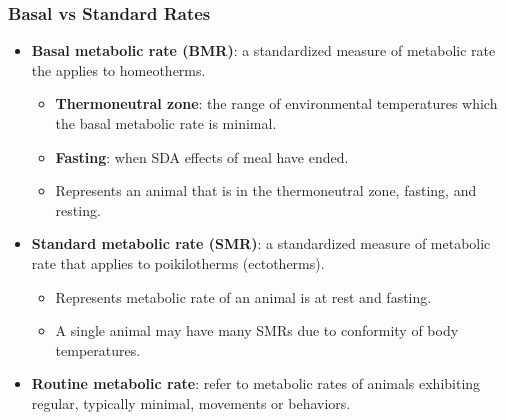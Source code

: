 \documentclass[12pt,a4paper]{article}
\begin{document}
\begin{itemize}
    \subsubsection{Basal vs Standard Rates}
    \begin{itemize}
        \item \textbf{Basal metabolic rate (BMR)}: a standardized measure of metabolic rate the applies to {\color{o-Sun}homeotherms}.
            \begin{itemize}
                \item \textbf{Thermoneutral zone}: the range of environmental temperatures which the basal metabolic rate is minimal.
                \item \textbf{Fasting}: when SDA effects of meal have ended.
                \item Represents an animal that is in the thermoneutral zone, fasting, and resting.
            \end{itemize}
        \item \textbf{Standard metabolic rate (SMR)}: a standardized measure of metabolic rate that applies to {\color{o-Sun}poikilotherms (ectotherms)}.
            \begin{itemize}
                \item Represents metabolic rate of an animal is at rest and fasting.
                \item A single animal may have many SMRs due to conformity of body temperatures.
            \end{itemize}
        \item \textbf{Routine metabolic rate}: refer to metabolic rates of animals exhibiting regular, typically minimal, movements or behaviors.
    \end{itemize}
\end{itemize}
\end{document}
